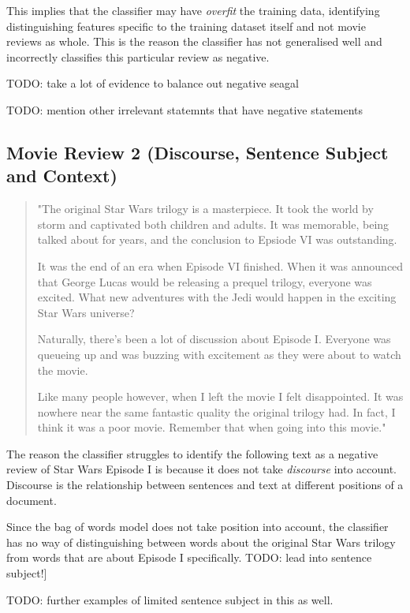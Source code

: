 \documentclass{article}
\begin{document}
This implies that the classifier may have \textit{overfit} the training data, identifying distinguishing features specific to the training dataset itself and not movie reviews as whole. This is the reason the classifier has not generalised well and incorrectly classifies this particular review as negative.

TODO: take a lot of evidence to balance out negative seagal

TODO: mention other irrelevant statemnts that have negative statements


\subsection{Movie Review 2 (Discourse, Sentence Subject and Context)}

\begin{quote}
"The original Star Wars trilogy is a masterpiece. It took the world by storm and captivated both children and adults. It was memorable, being talked about for years, and the conclusion to Epsiode VI was outstanding.

It was the end of an era when Episode VI finished. When it was announced that George Lucas would be releasing a prequel trilogy, everyone was excited. What new adventures with the Jedi would happen in the exciting Star Wars universe?

Naturally, there's been a lot of discussion about Episode I. Everyone was queueing up and was buzzing with excitement as they were about to watch the movie.

Like many people however, when I left the movie I felt disappointed. It was nowhere near the same fantastic quality the original trilogy had. In fact, I think it was a poor movie. Remember that when going into this movie."
\end{quote}

The reason the classifier struggles to identify the following text as a negative review of Star Wars Episode I is because it does not take \textit{discourse} into account. Discourse is the relationship between sentences and text at different positions of a document.

Since the bag of words model does not take position into account, the classifier has no way of distinguishing between words about the original Star Wars trilogy from words that are about Episode I specifically. TODO: lead into sentence subject!]

TODO: further examples of limited sentence subject in this as well.
\end{document}
